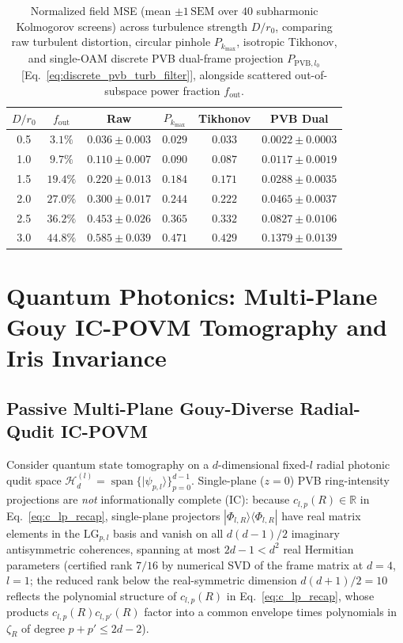 \documentclass[aps,pra,reprint,nofootinbib,floatfix,longbibliography]{revtex4-2}
\newcommand{\ket}[1]{| #1 \rangle}
\newcommand{\bra}[1]{\langle #1 |}
\begin{document}
\begin{table}[t]
\caption{Normalized field MSE (mean $\pm 1\,\mathrm{SEM}$ over $40$ subharmonic Kolmogorov screens) across turbulence strength $D/r_0$, comparing raw turbulent distortion, circular pinhole $P_{k_{\max}}$, isotropic Tikhonov, and single-OAM discrete PVB dual-frame projection $P_{\mathrm{PVB},l_0}$ [Eq.~\eqref{eq:discrete_pvb_turb_filter}], alongside scattered out-of-subspace power fraction $f_{\mathrm{out}}$.}
\label{tab:kolmogorov}
\begin{ruledtabular}
\footnotesize
\setlength{\tabcolsep}{1.8pt}
\begin{tabular}{cccccc}
$D/r_0$ & $f_{\mathrm{out}}$ & Raw & $P_{k_{\max}}$ & Tikhonov & PVB Dual \\
\hline
0.5 & $3.1\%$ & $0.036\pm 0.003$ & $0.029$ & $0.033$ & $0.0022\pm 0.0003$ \\
1.0 & $9.7\%$ & $0.110\pm 0.007$ & $0.090$ & $0.087$ & $0.0117\pm 0.0019$ \\
1.5 & $19.4\%$ & $0.220\pm 0.013$ & $0.184$ & $0.171$ & $0.0288\pm 0.0035$ \\
2.0 & $27.0\%$ & $0.300\pm 0.017$ & $0.244$ & $0.222$ & $0.0465\pm 0.0037$ \\
2.5 & $36.2\%$ & $0.453\pm 0.026$ & $0.365$ & $0.332$ & $0.0827\pm 0.0106$ \\
3.0 & $44.8\%$ & $0.585\pm 0.039$ & $0.471$ & $0.429$ & $0.1379\pm 0.0139$ \\
\end{tabular}
\end{ruledtabular}
\end{table}

\section{Quantum Photonics: Multi-Plane Gouy IC-POVM Tomography and Iris Invariance}
\label{sec:quantum}

\subsection{Passive Multi-Plane Gouy-Diverse Radial-Qudit IC-POVM}
\label{subsec:povm}

Consider quantum state tomography on a $d$-dimensional fixed-$l$ radial photonic qudit space $\mathcal{H}_d^{(l)} = \operatorname{span}\{\ket{\psi_{p,l}}\}_{p=0}^{d-1}$. Single-plane ($z = 0$) PVB ring-intensity projections are \emph{not} informationally complete (IC): because $c_{l,p}(R) \in \mathbb{R}$ in Eq.~\eqref{eq:c_lp_recap}, single-plane projectors $\ket{\Phi_{l,R}}\bra{\Phi_{l,R}}$ have real matrix elements in the $\mathrm{LG}_{p,l}$ basis and vanish on all $d(d-1)/2$ imaginary antisymmetric coherences, spanning at most $2d - 1 < d^2$ real Hermitian parameters (certified rank $7/16$ by numerical SVD of the frame matrix at $d = 4$, $l = 1$; the reduced rank below the real-symmetric dimension $d(d+1)/2 = 10$ reflects the polynomial structure of $c_{l,p}(R)$ in Eq.~\eqref{eq:c_lp_recap}, whose products $c_{l,p}(R)c_{l,p'}(R)$ factor into a common envelope times polynomials in $\zeta_R$ of degree $p + p' \le 2d - 2$).
\end{document}
